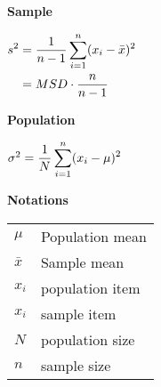 \begin{table}[H]
\begin{minipage}[t]{0.25\linewidth}

\textbf{Sample}\label{Data/Describing Data/Central Tendency/Variance/sample} \cite{statistics/book/Statistics-for-Data-Scientists/Maurits-Kaptein}

\vspace{0.3cm}

$
    \begin{aligned}
        s^2 
        &= \dfrac{1}{n-1} \displaystyle\sum_{i=1}^{n} (x_i - \bar{x})^2 \\
        &= MSD \cdot \dfrac{n}{n-1}
    \end{aligned}
$

\end{minipage}
\hspace{0.3cm}
\vrule width 1pt
\hspace{0.3cm}
\begin{minipage}[t]{0.25\linewidth}

\textbf{Population}\label{Data/Describing Data/Central Tendency/Variance/population} \cite{statistics/book/Statistics-for-Data-Scientists/Maurits-Kaptein}

\vspace{0.3cm}

$
    \sigma^2 
    = \dfrac{1}{N} \displaystyle\sum_{i=1}^{n} (x_i - \mu)^2
$

\end{minipage}
\hspace{0.3cm}
\vrule width 1pt
\hspace{0.3cm}
\begin{minipage}[t]{0.25\linewidth}

{\hfill\textbf{Notations}\hfill}

\begin{table}[H]
    \begin{tabular}{l l}
        $\mu$ & Population mean \\
        $\bar{x}$ & Sample mean \\
        $x_i$ & population item \\
        $x_i$ & sample item \\
        $N$ & population size \\
        $n$ & sample size \\
    \end{tabular}
\end{table}

\end{minipage}
\end{table}



